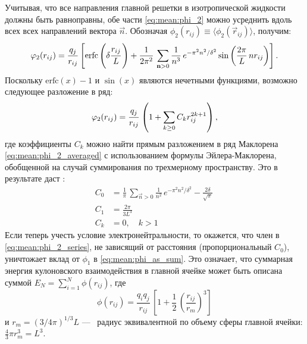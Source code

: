 Учитывая, что все направления главной решетки в изотропической жидкости должны быть равноправны, обе части \eqref{eq:mean:phi_2} можно усреднить вдоль всех всех направлений вектора $\vec{n}$.
Обозначая $\phi_2 (r_{ij}) \equiv \langle \phi_2 (\vec{r}_{ij}) \rangle$, получим:
\begin{equation}
    \label{eq:mean:phi_2_averaged}
    \phi_2 (r_{ij}) = \frac{q_{j}}{r_{ij}} \left[ \mathrm{erfc} \left( \delta \cfrac{r_{ij}}{L}\, \right) + \frac{1}{2\pi^2}\, \sum\limits_{\vec{n} > 0}^{} \frac{1}{n^3}\, e^{-\pi^2 n^2 / \delta^2} \sin \left( \frac{2\pi}{L}\, n r_{ij} \right) \right].
\end{equation}
Поскольку $\mathrm{erfc}(x) - 1$ и $\sin (x)$ являются нечетными функциями, возможно следующее разложение в ряд:
\begin{equation}
    \label{eq:mean:phi_2_series}
    \phi_2 (r_{ij}) = \cfrac{q_{j}}{r_{ij}}\, \left( 1 + \sum\limits_{k \geq 0}^{} C_{k} r_{ij}^{2k+1} \right),
\end{equation}
где коэффициенты $C_k$ можно найти прямым разложением в ряд Маклорена \eqref{eq:mean:phi_2_averaged} с использованием формулы Эйлера-Маклорена, обобщенной на случай суммирования по трехмерному пространству.
Это в результате даст \cite{jel:pre-averaged_summation}:
\begin{equation}
    \label{eq:mean:C_coeffs}
    \begin{aligned}
        C_0 &= \frac{1}{\pi}\, \sum\limits_{\vec{n} > 0}^{} \frac{1}{n^2}\, e^{-\pi^2 n^2 / \delta^2} - \frac{2\delta}{\sqrt{\pi}}\, \\
        C_1 &= \frac{2\pi}{3 L^3}\, \\
        C_k &= 0, \quad k > 1
    \end{aligned}
\end{equation}
Если теперь учесть условие электронейтральности, то окажется, что член в \eqref{eq:mean:phi_2_series}, не зависящий от расстояния (пропорциональный $C_0$), уничтожает вклад от $\phi_1$ в \eqref{eq:mean:phi_as_sum}.
Это означает, что суммарная энергия кулоновского взаимодействия в главной ячейке может быть описана суммой $E_N = \sum_{i=1}^N \phi (r_{ij})$, где
\begin{equation}
    \label{eq:mean:phi_final}
    \phi (r_{ij}) = \frac{q_i q_j}{r_{ij}}\, \left[ 1 + \frac{1}{2}\, \left( \frac{r_{ij}}{r_{m}} \right)^3 \right]
\end{equation}
и $r_{m} = (3 / 4 \pi)^{1 / 3} L$ ---~ радиус эквивалентной по объему сферы главной ячейки: $\frac{4}{3} \pi r_{m}^3 = L^3$.

